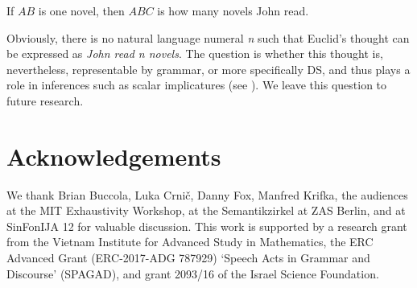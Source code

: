 \documentclass[output=paper]{langscibook}
\begin{document}
\ea
If $AB$ is one novel, then $ABC$ is how many novels John read.
\label{hai-tri:euclid}
\z

\noindent Obviously, there is no natural language numeral \textit{n} such that Euclid's thought can be expressed as \textit{John read n novels}. The question is whether this thought is, nevertheless, representable by grammar, or more specifically DS, and thus plays a role in inferences such as scalar implicatures (see ). We leave this question to future research.


\section*{Acknowledgements}
We thank Brian Buccola, Luka Crni\v{c}, Danny Fox, Manfred Krifka, the audiences at the MIT Exhaustivity Workshop, at the Semantikzirkel at ZAS Berlin, and at SinFonIJA 12 for valuable discussion. This work is supported by a research grant from the Vietnam Institute for Advanced Study in Mathematics, the ERC Advanced Grant (ERC-2017-ADG 787929) `Speech Acts in Grammar and Discourse' (SPAGAD), and grant 2093/16 of the Israel Science Foundation.

{\sloppy\printbibliography[heading=subbibliography,notkeyword=this]}
\end{document}
